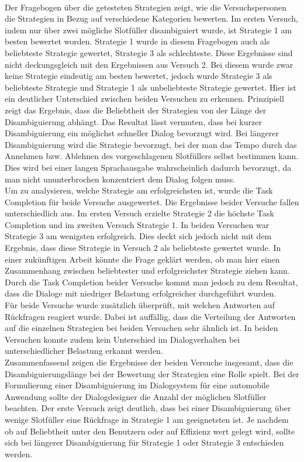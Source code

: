 \documentclass[12pt,a4paper]{scrartcl}
\begin{document}
\\
Der Fragebogen über die getesteten Strategien zeigt, wie die Versuchspersonen die Strategien in Bezug auf verschiedene Kategorien bewerten. Im ersten Versuch, indem nur über zwei mögliche Slotfüller disambiguiert wurde, ist Strategie 1 am besten bewertet worden. Strategie 1 wurde in diesem Fragebogen auch als beliebteste Strategie gewertet, Strategie 3 als schlechteste. Diese Ergebnisse sind nicht deckungsgleich mit den Ergebnissen aus Versuch 2. Bei diesem wurde zwar keine Strategie eindeutig am besten bewertet, jedoch wurde Strategie 3 als beliebteste Strategie und Strategie 1 als unbeliebteste Strategie gewertet. Hier ist ein deutlicher Unterschied zwischen beiden Versuchen zu erkennen. Prinzipiell zeigt das Ergebnis, dass die Beliebtheit der Strategien von der Länge der Disambiguierung abhängt. Das Resultat lässt vermuten, dass bei kurzer Disambiguierung ein möglichst schneller Dialog bevorzugt wird. Bei längerer Disambiguierung wird die Strategie bevorzugt, bei der man das Tempo durch das Annehmen bzw. Ablehnen des vorgeschlagenen Slotfüllers selbst bestimmen kann. Dies wird bei einer langen Sprachausgabe wahrscheinlich dadurch bevorzugt, da man nicht ununterbrochen konzentriert dem Dialog folgen muss. \\
\newline
Um zu analysieren, welche Strategie am erfolgreichsten ist, wurde die Task Completion für beide Versuche ausgewertet. Die Ergebnisse beider Versuche fallen unterschiedlich aus. Im ersten Versuch erzielte Strategie 2 die höchste Task Completion und im zweiten Versuch Strategie 1. In beiden Versuchen war Strategie 3 am wenigsten erfolgreich. Dies deckt sich jedoch nicht mit dem Ergebnis, dass diese Strategie in Versuch 2 als beliebteste gewertet wurde. In einer zukünftigen Arbeit könnte die Frage geklärt werden, ob man hier einen Zusammenhang zwischen beliebtester und erfolgreichster Strategie ziehen kann. 
Durch die Task Completion beider Versuche kommt man jedoch zu dem Resultat, dass die Dialoge mit niedriger Belastung erfolgreicher durchgeführt wurden. \\
\newline
Für beide Versuche wurde zusätzlich überprüft, mit welchen Antworten auf Rückfragen reagiert wurde. Dabei ist auffällig, dass die Verteilung der Antworten auf die einzelnen Strategien bei beiden Versuchen sehr ähnlich ist. In beiden Versuchen konnte zudem kein Unterschied im Dialogverhalten bei unterschiedlicher Belastung erkannt werden. \\
\newline
Zusammenfassend zeigen die Ergebnisse der beiden Versuche insgesamt, dass die Disambiguierungslänge bei der Bewertung der Strategien eine Rolle spielt. Bei der Formulierung einer Disambiguierung im Dialogsystem für eine automobile Anwendung sollte der Dialogdesigner die Anzahl der möglichen Slotfüller beachten. Der erste Versuch zeigt deutlich, dass bei einer Disambiguierung über wenige Slotfüller eine Rückfrage in Strategie 1 am geeignetsten ist. Je nachdem ob auf Beliebtheit unter den Benutzern oder auf Effizienz  wert gelegt wird, sollte sich bei längerer Disambiguierung für Strategie 1 oder Strategie 3 entschieden werden. 
\end{document}
